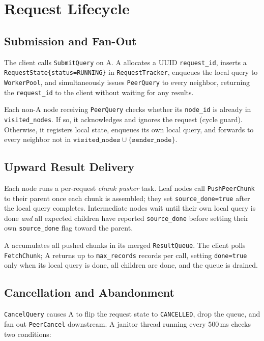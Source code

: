 \documentclass[conference]{IEEEtran}
\begin{document}
\section{Request Lifecycle}
\label{sec:lifecycle}

\subsection{Submission and Fan-Out}

The client calls \texttt{SubmitQuery} on A. A allocates a UUID
\texttt{request\_id}, inserts a \texttt{RequestState\{status=RUNNING\}} in
\texttt{RequestTracker}, enqueues the local query to \texttt{WorkerPool}, and
simultaneously issues \texttt{PeerQuery} to every neighbor, returning the
\texttt{request\_id} to the client without waiting for any results.

Each non-A node receiving \texttt{PeerQuery} checks whether its \texttt{node\_id}
is already in \texttt{visited\_nodes}. If so, it acknowledges and ignores the
request (cycle guard). Otherwise, it registers local state, enqueues its own
local query, and forwards to every neighbor not in
$\texttt{visited\_nodes} \cup \{\texttt{sender\_node}\}$.

\subsection{Upward Result Delivery}

Each node runs a per-request \emph{chunk pusher} task. Leaf nodes call
\texttt{PushPeerChunk} to their parent once each chunk is assembled; they
set \texttt{source\_done=true} after the local query completes. Intermediate
nodes wait until their own local query is done \emph{and} all expected children
have reported \texttt{source\_done} before setting their own
\texttt{source\_done} flag toward the parent.

A accumulates all pushed chunks in its merged \texttt{ResultQueue}. The client
polls \texttt{FetchChunk}; A returns up to \texttt{max\_records} records per
call, setting \texttt{done=true} only when its local query is done, all
children are done, and the queue is drained.

\subsection{Cancellation and Abandonment}

\texttt{CancelQuery} causes A to flip the request state to \texttt{CANCELLED},
drop the queue, and fan out \texttt{PeerCancel} downstream. A janitor thread
running every 500\,ms checks two conditions:
\end{document}
